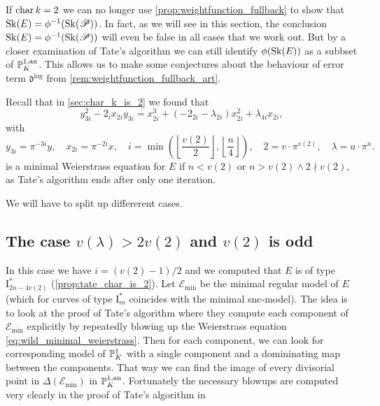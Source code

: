 If $\operatorname{char} k =2$ we can no longer use \cref{prop:weightfunction_fullback} to show that  $\sk(E) = \phi^{-1}(\sk(\mathscr P))$. 
In fact, as we will see in this section, the conclusion $\sk(E) = \phi^{-1}(\sk(\mathscr P))$ will even be false in all cases that we work out.  
But by a closer examination of Tate's algorithm we can still identify $\phi(\sk(E))$ as a subbset of $ \mathbb{P}_K^{1, \text{an}}$. 
This allows us to make some conjectures about the behaviour of error term $\mathfrak{d} ^{\text{log}}$ from \cref{rem:weightfunction_fullback_art}. 


Recall that in \cref{sec:char_k_is_2} we found that \begin{equation}\label{eq:wild_minimal_weierstrass}
y_{3i}^2 - 2_i x_{2i} y_{3i} = x_{2i}^3 + (-2_{2i} - \lambda_{2i}) x_{2i}^2 + \lambda_{4i} x_{2i}
,\end{equation} 
with \[
	y_{3i} = \pi^{-3i} y,\quad x_{2i} = \pi^{-2i} x, \quad i = \min\left( \left\lfloor \frac{v(2)}{2}\right\rfloor, \left\lfloor \frac{n}{4} \right\rfloor  \right), \quad 2 = v\cdot \pi^{v(2)},\quad  \lambda = u \cdot \pi^{n}
.\] 
is a minimal Weierstrass equation for $E$ if $n < v(2)$ or $n > v(2) \wedge 2 \nmid v(2)$, as Tate's algorithm ends after only one iteration. 

We will have to split up differerent cases. 
\subsection{The case $v(\lambda) > 2v(2)$ and $v(2)$ is odd} \label{sec:case_v_lambda_>_2_v_2_and_v_2_is_even}
In this case we have $i = (v(2) - 1) / 2$ and we computed that $E$ is of type $\mathrm I_{2n - 4v(2)}^*$ (\cref{prop:tate_char_is_2}).
Let $\mathscr E_\text{min} $ be the minimal regular model of $E$ (which for curves of type $\mathrm I_m^*$ coincides with the minimal snc-model).
The idea is to look at the proof of Tate's algorithm where they compute each component of $\mathscr E_\text{min} $ explicitly by repeatedly blowing up the Weierstrass equation \eqref{eq:wild_minimal_weierstrass}. 
Then for each component, we can look for corresponding model of $\mathbb{P}^{1}_K$ with a single component and a domininating map between the components. 
That way we can find the image of every divisorial point in $\Delta(\mathscr E_\text{min} )$ in $\mathbb{P}^{1, \text{an}}_K$. 
Fortunately the necessary blowups are computed very clearly in the proof of Tate's algorithm in \cite[p.\ 369-379]{silvermanAdvancedTopicsArithmetic1994}

